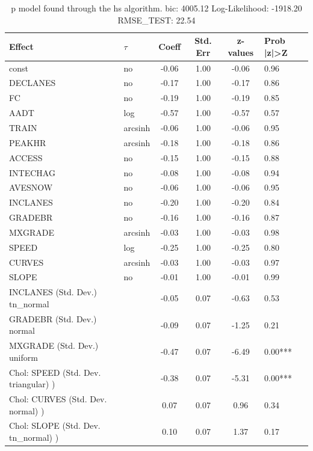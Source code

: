 \begin{table}
	\caption{p model found through the hs algorithm. bic: 4005.12 Log-Likelihood: -1918.20 RMSE_TEST: 22.54}
	\begin{center}
		\begin{tabular}{|l|l|c|c|c|l|}
			\hline
			Effect & $\tau$ & Coeff & Std. Err & z-values & Prob |z|>Z \\
			\hline
			const & no & -0.06 & 1.00 & -0.06 & 0.96 \\
			\hline
			DECLANES & no & -0.17 & 1.00 & -0.17 & 0.86 \\
			\hline
			FC & no & -0.19 & 1.00 & -0.19 & 0.85 \\
			\hline
			AADT & log & -0.57 & 1.00 & -0.57 & 0.57 \\
			\hline
			TRAIN & arcsinh & -0.06 & 1.00 & -0.06 & 0.95 \\
			\hline
			PEAKHR & arcsinh & -0.18 & 1.00 & -0.18 & 0.86 \\
			\hline
			ACCESS & no & -0.15 & 1.00 & -0.15 & 0.88 \\
			\hline
			INTECHAG & no & -0.08 & 1.00 & -0.08 & 0.94 \\
			\hline
			AVESNOW & no & -0.06 & 1.00 & -0.06 & 0.95 \\
			\hline
			INCLANES & no & -0.20 & 1.00 & -0.20 & 0.84 \\
			\hline
			GRADEBR & no & -0.16 & 1.00 & -0.16 & 0.87 \\
			\hline
			MXGRADE & arcsinh & -0.03 & 1.00 & -0.03 & 0.98 \\
			\hline
			SPEED & log & -0.25 & 1.00 & -0.25 & 0.80 \\
			\hline
			CURVES & arcsinh & -0.03 & 1.00 & -0.03 & 0.97 \\
			\hline
			SLOPE & no & -0.01 & 1.00 & -0.01 & 0.99 \\
			\hline
			INCLANES (Std. Dev.) tn_normal &  & -0.05 & 0.07 & -0.63 & 0.53 \\
			\hline
			GRADEBR (Std. Dev.) normal &  & -0.09 & 0.07 & -1.25 & 0.21 \\
			\hline
			MXGRADE (Std. Dev.) uniform &  & -0.47 & 0.07 & -6.49 & 0.00*** \\
			\hline
			 Chol: SPEED (Std. Dev. triangular) ) &  & -0.38 & 0.07 & -5.31 & 0.00*** \\
			\hline
			 Chol: CURVES (Std. Dev. normal) ) &  & 0.07 & 0.07 & 0.96 & 0.34 \\
			\hline
			 Chol: SLOPE (Std. Dev. tn_normal) ) &  & 0.10 & 0.07 & 1.37 & 0.17 \\

\end{tabular}
\end{center}
\end{table}
